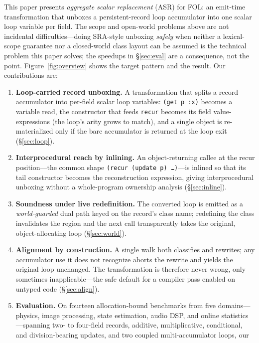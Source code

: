 \documentclass[sigplan,screen,review,anonymous]{acmart}
\begin{document}
This paper presents \emph{aggregate scalar replacement} (ASR) for FOL: an
emit-time transformation that unboxes a persistent-record loop accumulator
into one scalar loop variable per field. The scope and open-world problems
above are not incidental difficulties---doing SRA-style
unboxing \emph{safely} when neither a lexical-scope guarantee nor a
closed-world class layout can be assumed is the technical problem this paper
solves; the speedups in \S\ref{sec:eval} are a consequence, not the
point. Figure~\ref{fig:overview} shows the target pattern and the
result. Our contributions are:

\begin{enumerate}
  \item \textbf{Loop-carried record unboxing.} A transformation that splits a
  record accumulator into per-field scalar loop variables: \texttt{(get p :x)}
  becomes a variable read, the constructor that feeds \texttt{recur} becomes its
  field value-expressions (the loop's arity grows to match), and a single
  object is re-materialized only if the bare accumulator is returned at the loop
  exit (\S\ref{sec:loop}).
  \item \textbf{Interprocedural reach by inlining.} An object-returning callee
  at the recur position---the common shape \texttt{(recur (update p) \ldots)}---is
  inlined so that its tail constructor becomes the reconstruction expression,
  giving interprocedural unboxing without a whole-program ownership analysis
  (\S\ref{sec:inline}).
  \item \textbf{Soundness under live redefinition.} The converted loop is
  emitted as a \emph{world-guarded} dual path keyed on the record's class name;
  redefining the class invalidates the region and the next call transparently
  takes the original, object-allocating loop (\S\ref{sec:world}).
  \item \textbf{Alignment by construction.} A single walk both classifies and
  rewrites; any accumulator use it does not recognize aborts the rewrite and
  yields the original loop unchanged. The transformation is therefore never
  wrong, only sometimes inapplicable---the safe default for a compiler pass
  enabled on untyped code (\S\ref{sec:align}).
  \item \textbf{Evaluation.} On fourteen allocation-bound benchmarks from five
  domains---physics, image processing, state estimation, audio DSP, and online
  statistics---spanning two- to four-field records, additive, multiplicative,
  conditional, and division-bearing updates, and two coupled multi-accumulator loops, our

\end{enumerate}
\end{document}
